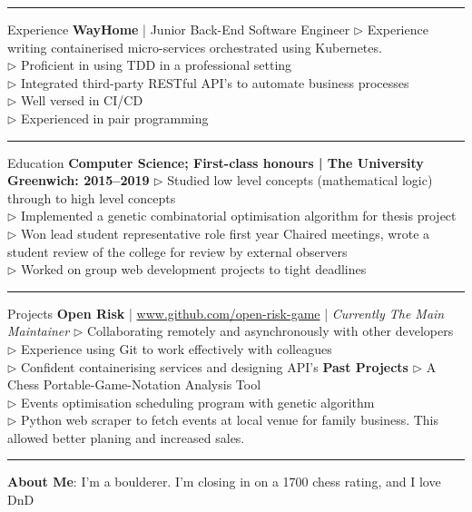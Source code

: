 \documentclass[12pt,twoside]{article}
\begin{document}
\vspace{0.5em}
\hrule
\vspace{0.5em}

\headedsection
    {Experience}
    {
        \textbf{WayHome} | Junior Back-End Software Engineer}
    {
        $\triangleright$ Experience writing containerised micro-services
        orchestrated using Kubernetes. \\
        $\triangleright$ Proficient in using TDD in a professional setting \\
        $\triangleright$ Integrated third-party RESTful API's to automate business processes \\
        $\triangleright$ Well versed in CI/CD \\
        $\triangleright$ Experienced in pair programming
    }

\vspace{0.5em}
\hrule
\vspace{0.5em}

\headedsection
    {Education}
    {
        \textbf{Computer Science; First-class honours | The University
        Greenwich: 2015--2019}
    }
    {
        $\triangleright$ Studied low level concepts (mathematical logic)
        through to high level concepts \\
        $\triangleright$ Implemented a genetic combinatorial optimisation
        algorithm for thesis project \\
        $\triangleright$ Won lead student representative role first year
        Chaired meetings, wrote a student review of the college for review by
        external observers \\
        $\triangleright$ Worked on group web development projects to tight deadlines
    }

\vspace{0.5em}
\hrule
\vspace{0.5em}

\headedsection
    {Projects}
    {\textbf{Open Risk} | \url{www.github.com/open-risk-game} | \textit{Currently The Main Maintainer}}
    {
        $\triangleright$ Collaborating remotely and asynchronously with other developers \\
        $\triangleright$ Experience using Git to work effectively with colleagues \\
        $\triangleright$ Confident containerising services and designing API's
    }
\headedsection
    {}
    {\textbf{Past Projects}}
    {
        $\triangleright$ A Chess Portable-Game-Notation Analysis Tool \\
        $\triangleright$ Events optimisation scheduling program with genetic algorithm \\
        $\triangleright$ Python web scraper to fetch events at local venue for
        family business. This allowed better planing and increased sales.
    }

\vspace{0.5em}
\hrule
\vspace{0.5em}

\hspace{-1.3em}\textbf{About Me}: I'm a boulderer. I'm closing in on a 1700 chess rating, and I love DnD
\end{document}
